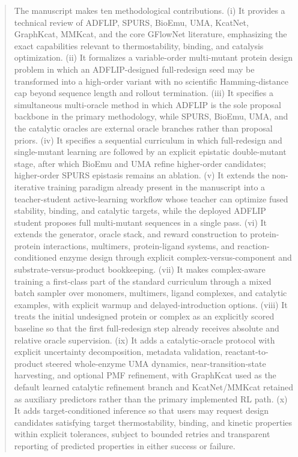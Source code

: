 \documentclass[11pt]{article}
\begin{document}
\begin{abstract}
		The manuscript makes ten methodological contributions. (i) It provides a technical review of ADFLIP, SPURS, BioEmu, UMA, KcatNet, GraphKcat, MMKcat, and the core GFlowNet literature, emphasizing the exact capabilities relevant to thermostability, binding, and catalysis optimization. (ii) It formalizes a variable-order multi-mutant protein design problem in which an ADFLIP-designed full-redesign seed may be transformed into a high-order variant with no scientific Hamming-distance cap beyond sequence length and rollout termination. (iii) It specifies a simultaneous multi-oracle method in which ADFLIP is the sole proposal backbone in the primary methodology, while SPURS, BioEmu, UMA, and the catalytic oracles are external oracle branches rather than proposal priors. (iv) It specifies a sequential curriculum in which full-redesign and single-mutant learning are followed by an explicit epistatic double-mutant stage, after which BioEmu and UMA refine higher-order candidates; higher-order SPURS epistasis remains an ablation. (v) It extends the non-iterative training paradigm already present in the manuscript into a teacher-student active-learning workflow whose teacher can optimize fused stability, binding, and catalytic targets, while the deployed ADFLIP student proposes full multi-mutant sequences in a single pass. (vi) It extends the generator, oracle stack, and reward construction to protein-protein interactions, multimers, protein-ligand systems, and reaction-conditioned enzyme design through explicit complex-versus-component and substrate-versus-product bookkeeping. (vii) It makes complex-aware training a first-class part of the standard curriculum through a mixed batch sampler over monomers, multimers, ligand complexes, and catalytic examples, with explicit warmup and delayed-introduction options. (viii) It treats the initial undesigned protein or complex as an explicitly scored baseline so that the first full-redesign step already receives absolute and relative oracle supervision. (ix) It adds a catalytic-oracle protocol with explicit uncertainty decomposition, metadata validation, reactant-to-product steered whole-enzyme UMA dynamics, near-transition-state harvesting, and optional PMF refinement, with GraphKcat used as the default learned catalytic refinement branch and KcatNet/MMKcat retained as auxiliary predictors rather than the primary implemented RL path. (x) It adds target-conditioned inference so that users may request design candidates satisfying target thermostability, binding, and kinetic properties within explicit tolerances, subject to bounded retries and transparent reporting of predicted properties in either success or failure.
		

\end{abstract}
\end{document}
